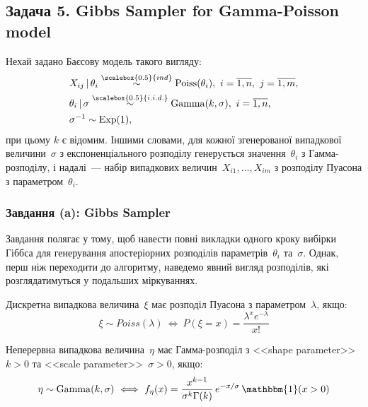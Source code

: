 \subsection*{Задача 5. Gibbs Sampler for Gamma-Poisson model}

\setcounter{subsection}{5}
\setcounter{equation}{0}

Нехай задано Баєсову модель такого вигляду:
\begin{align}
    & X_{ij} \,|\, \theta_i \overset{\scalebox{0.5}{ind}}{\sim} \mathrm{Poiss}(\theta_i),\ i=\overline{1,n},\ j=\overline{1,m}, \label{task 5 - eq: Bayes model Xij} \\
    & \theta_i \,|\, \sigma \overset{\scalebox{0.5}{i.i.d.}}{\sim} \mathrm{Gamma}(k,\sigma),\ i=\overline{1,n}, \label{task 5 - eq: Bayes model theta} \\
    & \sigma^{-1} \sim \mathrm{Exp}(1), \label{task 5 - eq: Bayes model sigma}
\end{align}
при цьому $k$ є відомим. Іншими словами, для кожної згенерованої випадкової величини~$\sigma$ з експоненціального розподілу генерується значення~$\theta_i$ з Гамма-розподілу, і надалі~--- набір випадкових величин~$X_{i1},\ldots,X_{im}$ з розподілу Пуасона з параметром~$\theta_i$.

\subsubsection*{Завдання (a): Gibbs Sampler}

Завдання полягає у тому, щоб навести повні викладки одного кроку вибірки Гіббса для генерування апостеріорних розподілів параметрів~$\theta_i$ та~$\sigma$. Однак, перш ніж переходити до алгоритму, наведемо явний вигляд розподілів, які розглядатимуться у подальших міркуваннях.  

Дискретна випадкова величина~$\xi$ має розподіл Пуасона з параметром~$\lambda$, якщо: 
\begin{equation}\label{task 5 - eq: dPoisson}
    \xi \sim Poiss(\lambda) \ \Longleftrightarrow \ P(\xi=x) = \frac{\lambda^{x}e^{-\lambda}}{x!} 
\end{equation}

Неперервна випадкова величина~$\eta$ має Гамма-розподіл з <<shape parameter>> $k>0$ та <<scale parameter>>~$\sigma>0$, якщо:
\begin{equation}\label{task 5 - eq: dGamma}
    \eta \sim \mathrm{Gamma}(k,\sigma) \ \Longleftrightarrow \ f_{\eta}(x) = \frac{x^{k-1}}{\sigma^{k}\Gamma(k)}\, e^{-x/\sigma}\, \mathbbm{1}(x>0)
\end{equation}

